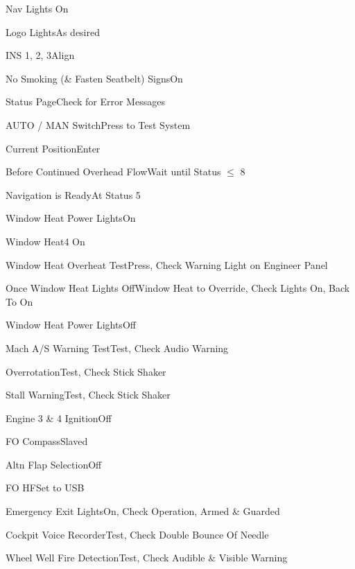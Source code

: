 \documentclass[sim-use]{checklist}
\begin{document}
\begin{continuedchecklist}
	\item{Nav Lights} {On}
	\item{Logo Lights}{As desired}
	\item{INS 1, 2, 3}{Align}
	\item{No Smoking (\& Fasten Seatbelt) Signs}{On}
	
	 {
		\item{Status Page}{Check for Error Messages}
		\item{AUTO / MAN Switch}{Press to Test System}
		\item{Current Position}{Enter}
		\item{Before Continued Overhead Flow}{Wait until Status $\le$ 8}
		\item{Navigation is Ready}{At Status 5}
	}
	
	 {
		\item{Window Heat Power Lights}{On}
		\item{Window Heat}{4 On}
		\item{Window Heat Overheat Test}{Press, Check Warning Light on Engineer Panel}
		\item{Once Window Heat Lights Off}{Window Heat to Override, Check Lights On, Back To On}
		\item{Window Heat Power Lights}{Off}
	}
	
	
	 {
		\item{Mach A/S Warning Test}{Test, Check Audio Warning}
		\item{Overrotation}{Test, Check Stick Shaker}
		\item{Stall Warning}{Test, Check Stick Shaker}
	}
	
	 {
		\item{Engine 3 \& 4 Ignition}{Off}
		\item{FO Compass}{Slaved}
		\item{Altn Flap Selection}{Off}
		\item{FO HF}{Set to USB}
	}
	
	\item{Emergency Exit Lights}{On, Check Operation, Armed \& Guarded}
	\item{Cockpit Voice Recorder}{Test, Check Double Bounce Of Needle}
	\item{Wheel Well Fire Detection}{Test, Check Audible \& Visible Warning}
\end{continuedchecklist}
\end{document}
